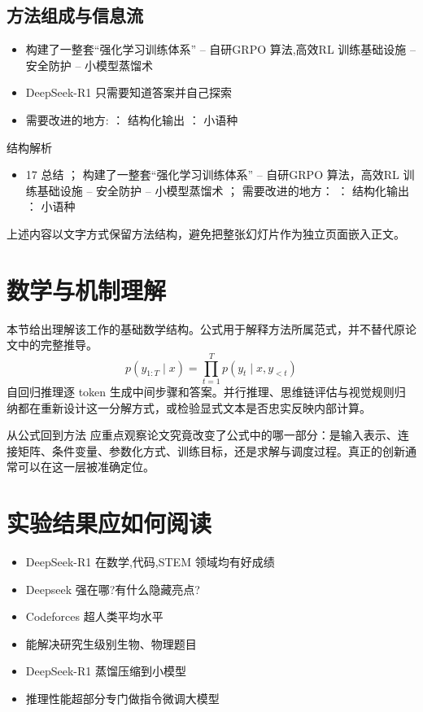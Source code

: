 \documentclass[UTF8,11pt,a4paper]{ctexart}
\begin{document}
\subsection{方法组成与信息流}
\begin{itemize}
\item 构建了一整套“强化学习训练体系” – 自研GRPO 算法,高效RL 训练基础设施 – 安全防护 – 小模型蒸馏术
\item DeepSeek-R1 只需要知道答案并自己探索
\item 需要改进的地方: ： 结构化输出 ： 小语种
\end{itemize}

\begin{keybox}{结构解析}
\begin{itemize}
\item 17 总结 ； 构建了一整套“强化学习训练体系” – 自研GRPO 算法，高效RL 训练基础设施 – 安全防护 – 小模型蒸馏术 ； 需要改进的地方： ： 结构化输出 ： 小语种
\end{itemize}
\end{keybox}

上述内容以文字方式保留方法结构，避免把整张幻灯片作为独立页面嵌入正文。

\section{数学与机制理解}
本节给出理解该工作的基础数学结构。公式用于解释方法所属范式，并不替代原论文中的完整推导。
\begin{equation}
p(y_{1:T}\mid x)=\prod_{t=1}^{T}p(y_t\mid x,y_{<t})
\end{equation}
自回归推理逐 token 生成中间步骤和答案。并行推理、思维链评估与视觉规则归纳都在重新设计这一分解方式，或检验显式文本是否忠实反映内部计算。

\begin{keybox}{从公式回到方法}
应重点观察论文究竟改变了公式中的哪一部分：是输入表示、连接矩阵、条件变量、参数化方式、训练目标，还是求解与调度过程。真正的创新通常可以在这一层被准确定位。
\end{keybox}


\section{实验结果应如何阅读}
\begin{itemize}
\item DeepSeek-R1 在数学,代码,STEM 领域均有好成绩
\item Deepseek 强在哪?有什么隐藏亮点?
\item Codeforces 超人类平均水平
\item 能解决研究生级别生物、物理题目
\item DeepSeek-R1 蒸馏压缩到小模型
\item 推理性能超部分专门做指令微调大模型
\end{itemize}
\end{document}
